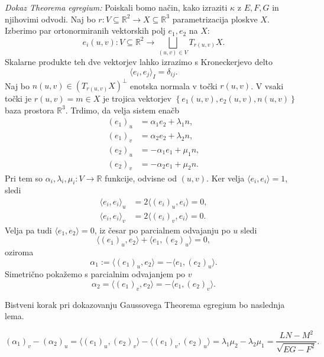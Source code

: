 \noindent
{\em Dokaz Theorema egregium:\/}
Poiskali bomo način, kako izraziti $\kappa$ z $E, F, G$ in njihovimi odvodi. Naj bo $r: V \subseteq \mathbb{R}^2 \to  X \subseteq  \mathbb{R}^3$ parametrizacija ploskve $X$. Izberimo par ortonormiranih
vektorskih polj $e_1, e_2$ na $X$: \begin{equation*}
e_i(u,v): V \subseteq \mathbb{R}^2  \to \bigsqcup_{(u,v) \in  V} T_{r(u,v)}X.
\end{equation*}  
Skalarne produkte teh dve vektorjev lahko izrazimo s Kroneckerjevo delto \begin{equation*}
\langle e_i, e_j \rangle_{I} = \delta_{ij}. 
\end{equation*}
Naj bo $n(u,v) \in (T_{r(u,v)}X)^{\perp}$ enotska normala v točki $r(u,v)$. V vsaki točki je $r(u,v) = m \in  X$ je trojica vektorjev $\left\{ e_1(u,v), e_2(u,v), n(u,v)\right\}$ baza prostora $\mathbb{R}^3$. 
Trdimo, da velja sistem enačb \begin{align*}
    (e_1)_u &= \alpha_1 e_2 + \lambda_1 n, \\
    (e_1)_v &= \alpha_2 e_2 + \lambda_2 n, \\
    (e_2)_u &= - \alpha_1 e_1 + \mu_1 n, \\
    (e_2)_v &= - \alpha_2 e_1 + \mu_2 n.
\end{align*}
Pri tem so $\alpha_i, \lambda_i, \mu_i: V \to \mathbb{R}$ funkcije, odvisne od $(u,v)$.
Ker velja $\langle e_i, e_i \rangle = 1 $, sledi \begin{align*}
    \langle e_i, e_i \rangle_u  &=  2 \langle (e_i)_u, e_i \rangle  = 0, \\
    \langle e_i, e_i \rangle_v  &=  2 \langle (e_i)_v, e_i \rangle  = 0.
\end{align*}
Velja pa tudi $\langle e_1, e_2 \rangle = 0$, iz česar po parcialnem odvajanju po $u$ sledi
\begin{equation*}
    \langle (e_1)_u, e_2 \rangle + \langle e_1, (e_2)_u \rangle = 0, 
\end{equation*}  
oziroma \begin{equation*}
\alpha_1 := \langle (e_1)_u, e_2 \rangle = - \langle e_1, (e_2)_u \rangle.    
\end{equation*}  
Simetrično pokažemo s parcialnim odvajanjem po $v$ \begin{equation*}
\alpha_2  = \langle (e_1)_v, e_2 \rangle = - \langle e_1, (e_2)_v \rangle.
\end{equation*}  

Bistveni korak pri dokazovanju Gaussovega Theorema egregium bo naslednja lema.
\begin{lema}
\begin{equation*}
(\alpha_1)_v - (\alpha_2)_u = \langle  (e_1)_u, (e_2)_v \rangle - \langle (e_1)_v , (e_2)_u \rangle  = \lambda_1 \mu_2 - \lambda_2 \mu_1 =  \frac{LN - M^2}{\sqrt{EG - F^2} }.
\end{equation*}  
\end{lema}

